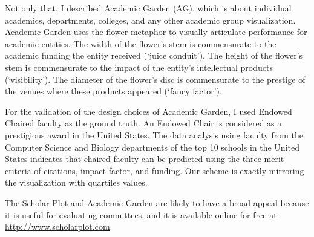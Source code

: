 Not only that, I described Academic Garden (AG), which is about individual academics, departments, colleges, and any other academic group visualization. Academic Garden uses the flower metaphor to visually articulate performance for academic entities. The width of the flower's stem is commensurate to the academic funding the entity received (`juice conduit'). The height of the flower's stem is commensurate to the impact of the entity's intellectual products (`visibility'). The diameter of the flower's disc is commensurate to the prestige of the venues where these products appeared (`fancy factor').

For the validation of the design choices of Academic Garden, I used Endowed Chaired faculty as the ground truth. An Endowed Chair is considered as a prestigious award in the United States. The data analysis using faculty from the Computer Science and Biology departments of the top 10 schools in the United States indicates that chaired faculty can be predicted using the three merit criteria of citations, impact factor, and funding. Our scheme is exactly mirroring the visualization with quartiles values.

The Scholar Plot and Academic Garden are likely to have a broad appeal because it is useful for evaluating committees, and it is available online for free at \url{http://www.scholarplot.com}.






